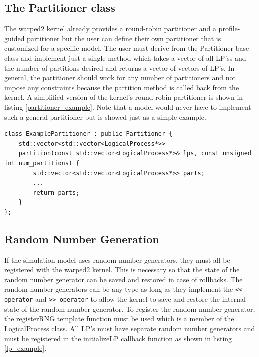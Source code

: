 \documentclass[11pt]{book}
\begin{document}
\subsection{The Partitioner class}\label{partitioner}

The warped2 kernel already provides a round-robin partitioner and a profile-guided partitioner
but the user can define their own partitioner that is customized for a specific model.
The user must derive from the Partitioner base class and implement just a single method
which takes a vector of all LP'ss and the number of partitions desired and returns a vector
of vectors of LP's. In general, the partitioner should work for any number of partitioners
and not impose any constraints because the partition method is called back from the kernel.
A simplified version of the kernel's round-robin partitioner is shown in listing
\ref{partitioner_example}. Note that a model would never have to implement such a general
partitioner but is showed just as a simple example.

\begin{lstlisting}[caption=Example \textsc{warped2} Partitioner Definition, label=partitioner_example, float]
class ExamplePartitioner : public Partitioner {
    std::vector<std::vector<LogicalProcess*>>
    partition(const std::vector<LogicalProcess*>& lps, const unsigned int num_partitions) {
        std::vector<std::vector<LogicalProcess*>> parts;
        ...
        return parts;
    }
};
\end{lstlisting}

\subsection{Random Number Generation}

If the simulation model uses random number generators, they must all be registered with the
warped2 kernel. This is necessary so that the state of the random number generator can be
saved and restored in case of rollbacks. The random number generators can be any type as
long as they implement the \texttt{<< operator} and \texttt{>> operator} to allow the kernel
to save and restore the internal state of the random number generator. To register the
random number generator, the registerRNG template function must be used which is a member
of the LogicalProcess class. All LP's must have separate random number generators and must
be registered in the initializeLP callback function as shown in listing \ref{lp_example}.
\end{document}
